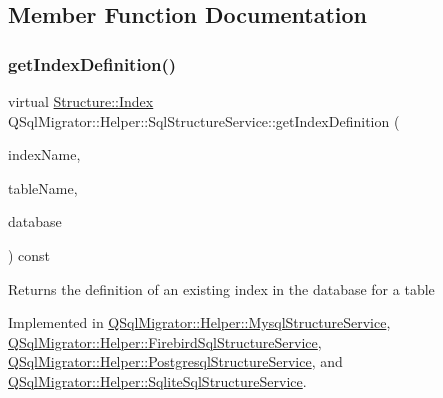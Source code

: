 \subsection{Member Function Documentation}
\mbox{\label{class_q_sql_migrator_1_1_helper_1_1_sql_structure_service_ab62049f95710fc0965097f08b410e790}} 
\subsubsection{\texorpdfstring{get\+Index\+Definition()}{getIndexDefinition()}}
{\footnotesize\ttfamily virtual \hyperlink{class_q_sql_migrator_1_1_structure_1_1_index}{Structure\+::\+Index} Q\+Sql\+Migrator\+::\+Helper\+::\+Sql\+Structure\+Service\+::get\+Index\+Definition (\begin{DoxyParamCaption}\item[{const Q\+String \&}]{index\+Name,  }\item[{const Q\+String \&}]{table\+Name,  }\item[{Q\+Sql\+Database}]{database }\end{DoxyParamCaption}) const\hspace{0.3cm}{\ttfamily [pure virtual]}}

\begin{DoxyReturn}{Returns}
the definition of an existing index in the database for a table 
\end{DoxyReturn}


Implemented in \hyperlink{class_q_sql_migrator_1_1_helper_1_1_mysql_structure_service_a726f1171c0cc1eb76638725b0a06ba78}{Q\+Sql\+Migrator\+::\+Helper\+::\+Mysql\+Structure\+Service}, \hyperlink{class_q_sql_migrator_1_1_helper_1_1_firebird_sql_structure_service_ae11053be8caa809aae7724741dc68c2b}{Q\+Sql\+Migrator\+::\+Helper\+::\+Firebird\+Sql\+Structure\+Service}, \hyperlink{class_q_sql_migrator_1_1_helper_1_1_postgresql_structure_service_ae2e7c6b4e341b0613817fe62c6de4b2d}{Q\+Sql\+Migrator\+::\+Helper\+::\+Postgresql\+Structure\+Service}, and \hyperlink{class_q_sql_migrator_1_1_helper_1_1_sqlite_sql_structure_service_a89a0b25add0eba4af541a4950889c305}{Q\+Sql\+Migrator\+::\+Helper\+::\+Sqlite\+Sql\+Structure\+Service}.

